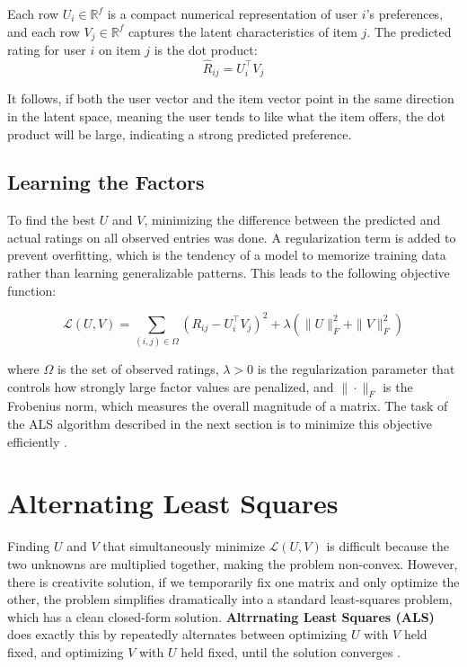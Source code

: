 \documentclass[12pt,a4paper]{report}
\begin{document}
Each row \( U_i \in \mathbb{R}^f \) is a compact numerical representation of user \( i \)'s preferences, and each row \( V_j \in \mathbb{R}^f \) captures the latent characteristics of item \( j \). The predicted rating for user \( i \) on item \( j \) is the dot product:
\[
\hat{R}_{ij} = U_i^\top V_j
\]

It follows, if both the user vector and the item vector point in the same direction in the latent space, meaning the user tends to like what the item offers, the dot product will be large, indicating a strong predicted preference.

\subsection*{Learning the Factors}

To find the best \( U \) and \( V \), minimizing the difference between the predicted and actual ratings on all observed entries was done. A regularization term is added to prevent overfitting, which is the tendency of a model to memorize training data rather than learning generalizable patterns. This leads to the following objective function:

\[
\mathcal{L}(U, V) = \sum_{(i,j) \in \Omega} \left( R_{ij} - U_i^\top V_j
\right)^2 + \lambda \left( \|U\|_F^2 + \|V\|_F^2 \right)
\]

where \( \Omega \) is the set of observed ratings, \( \lambda > 0 \) is the regularization parameter that controls how strongly large factor values are penalized, and \( \| \cdot \|_F \) is the Frobenius norm, which measures the overall magnitude of a matrix. The task of the ALS algorithm described in the next section is to minimize this objective efficiently \parencite{koren2009matrix}.

\section{Alternating Least Squares}

Finding \( U \) and \( V \) that simultaneously minimize \( \mathcal{L}(U, V) \) is difficult because the two unknowns are multiplied together, making the problem non-convex. However, there is creativite solution, if we temporarily fix one matrix and only optimize the other, the problem simplifies dramatically into a standard least-squares problem, which has a clean closed-form solution. \textbf{Altrrnating Least Squares (ALS)} does exactly this by repeatedly alternates between optimizing \( U \) with \( V \) held fixed, and optimizing \( V \) with \( U \) held fixed, until the solution converges \parencite{zhou2008large}.
\end{document}
